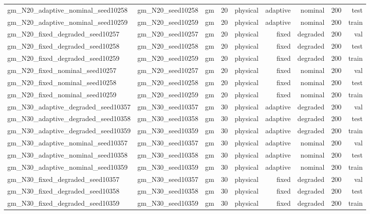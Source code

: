 \begin{tabular}{lrrrrrrrr}
gm\_N20\_adaptive\_nominal\_seed10258 & gm\_N20\_seed10258 & gm & 20 & physical & adaptive & nominal & 200 & test \\
gm\_N20\_adaptive\_nominal\_seed10259 & gm\_N20\_seed10259 & gm & 20 & physical & adaptive & nominal & 200 & train \\
gm\_N20\_fixed\_degraded\_seed10257 & gm\_N20\_seed10257 & gm & 20 & physical & fixed & degraded & 200 & val \\
gm\_N20\_fixed\_degraded\_seed10258 & gm\_N20\_seed10258 & gm & 20 & physical & fixed & degraded & 200 & test \\
gm\_N20\_fixed\_degraded\_seed10259 & gm\_N20\_seed10259 & gm & 20 & physical & fixed & degraded & 200 & train \\
gm\_N20\_fixed\_nominal\_seed10257 & gm\_N20\_seed10257 & gm & 20 & physical & fixed & nominal & 200 & val \\
gm\_N20\_fixed\_nominal\_seed10258 & gm\_N20\_seed10258 & gm & 20 & physical & fixed & nominal & 200 & test \\
gm\_N20\_fixed\_nominal\_seed10259 & gm\_N20\_seed10259 & gm & 20 & physical & fixed & nominal & 200 & train \\
gm\_N30\_adaptive\_degraded\_seed10357 & gm\_N30\_seed10357 & gm & 30 & physical & adaptive & degraded & 200 & val \\
gm\_N30\_adaptive\_degraded\_seed10358 & gm\_N30\_seed10358 & gm & 30 & physical & adaptive & degraded & 200 & test \\
gm\_N30\_adaptive\_degraded\_seed10359 & gm\_N30\_seed10359 & gm & 30 & physical & adaptive & degraded & 200 & train \\
gm\_N30\_adaptive\_nominal\_seed10357 & gm\_N30\_seed10357 & gm & 30 & physical & adaptive & nominal & 200 & val \\
gm\_N30\_adaptive\_nominal\_seed10358 & gm\_N30\_seed10358 & gm & 30 & physical & adaptive & nominal & 200 & test \\
gm\_N30\_adaptive\_nominal\_seed10359 & gm\_N30\_seed10359 & gm & 30 & physical & adaptive & nominal & 200 & train \\
gm\_N30\_fixed\_degraded\_seed10357 & gm\_N30\_seed10357 & gm & 30 & physical & fixed & degraded & 200 & val \\
gm\_N30\_fixed\_degraded\_seed10358 & gm\_N30\_seed10358 & gm & 30 & physical & fixed & degraded & 200 & test \\
gm\_N30\_fixed\_degraded\_seed10359 & gm\_N30\_seed10359 & gm & 30 & physical & fixed & degraded & 200 & train \\

\end{tabular}
